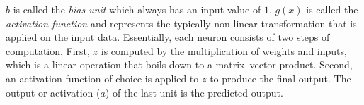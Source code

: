 $b$ is called the \emph{bias unit} which always has an input value of $1$. $g(x)$ is called the \emph{activation function} and represents the typically non-linear transformation that is applied on the input data. Essentially, each neuron consists of two steps of computation. First, $z$ is computed by the multiplication of weights and inputs, which is a linear operation that boils down to a matrix--vector product.
Second, an activation function of choice is applied to $z$ to produce the final output. The output or activation ($a$) of the last unit is the predicted output.\\

